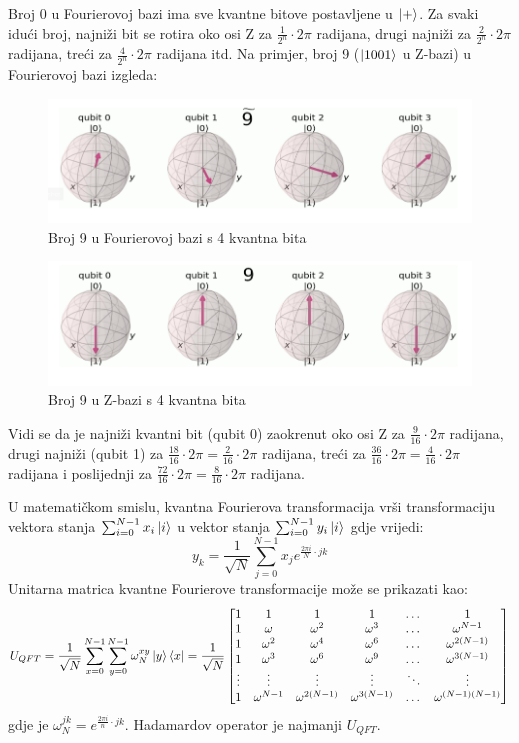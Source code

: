 Broj 0 u Fourierovoj bazi ima sve kvantne bitove postavljene u $\ket{+}$. Za svaki idući broj, najniži bit se rotira oko osi Z za $\frac{1}{2^n}\cdot 2\pi$ radijana, drugi najniži za $\frac{2}{2^n}\cdot 2\pi$ radijana, treći za $\frac{4}{2^n}\cdot 2\pi$ radijana itd. Na primjer, broj 9 ($\ket{1001}$ u Z-bazi) u Fourierovoj bazi izgleda:
\begin{figure}[H]
\centering
\includegraphics[scale=0.65]{img/Fourier9.png}
\caption{Broj 9 u Fourierovoj bazi s 4 kvantna bita}
\end{figure}

\begin{figure}[H]
\centering
\includegraphics[scale=0.65]{img/Zbase9.png}
\caption{Broj 9 u Z-bazi s 4 kvantna bita}
\end{figure}

Vidi se da je najniži kvantni bit (qubit 0) zaokrenut oko osi Z za $\frac{9}{16}\cdot 2\pi$ radijana, drugi najniži (qubit 1) za $\frac{18}{16}\cdot 2\pi = \frac{2}{16}\cdot 2\pi$ radijana, treći za $\frac{36}{16}\cdot 2\pi = \frac{4}{16}\cdot 2\pi$ radijana i poslijednji za $\frac{72}{16}\cdot 2\pi = \frac{8}{16}\cdot 2\pi$ radijana.


U matematičkom smislu, kvantna Fourierova transformacija vrši transformaciju vektora stanja $\sum_{i=0}^{N-1}x_i\ket{i}$ u vektor stanja $\sum_{i=0}^{N-1}y_i\ket{i}$ gdje vrijedi:
\[
y_k = \frac{1}{\sqrt{N}}\sum_{j=0}^{N-1}x_j e^{\frac{2\pi i}{N}\cdot jk}
\]
Unitarna matrica kvantne Fourierove transformacije može se prikazati kao:
\[
U_{QFT} = \frac{1}{\sqrt{N}}\sum_{x=0}^{N-1}\sum_{y=0}^{N-1}\omega_N^{xy}\ket{y}\bra{x} 
= \frac{1}{\sqrt{N}}\begin{bmatrix}
1 & 1 & 1 & 1 & \dots & 1 \\
1 & \omega & \omega^2 & \omega^3 & \dots & \omega^{N-1} \\
1 & \omega^2 & \omega^4 & \omega^6 & \dots & \omega^{2(N-1)} \\
1 & \omega^3 & \omega^6 & \omega^9 & \dots & \omega^{3(N-1)} \\
\vdots & \vdots & \vdots & \vdots & \ddots & \vdots \\
1 & \omega^{N-1} & \omega^{2(N-1)} & \omega^{3(N-1)} & \dots & \omega^{(N-1)(N-1)} \\
\end{bmatrix}
\]
gdje je $\omega_N^{jk} = e^{\frac{2\pi i}{n}\cdot jk}$. Hadamardov operator je najmanji $U_{QFT}$.

